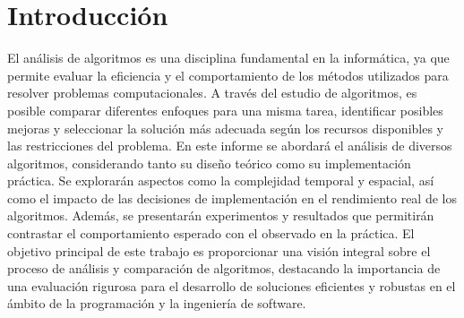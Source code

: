 \section{Introducción}
El análisis de algoritmos es una disciplina fundamental en la informática, ya que permite evaluar la eficiencia y el comportamiento de los métodos utilizados para resolver problemas computacionales.
A través del estudio de algoritmos, es posible comparar diferentes enfoques para una misma tarea, identificar posibles mejoras y seleccionar la solución más adecuada según los recursos disponibles y las restricciones del problema.
En este informe se abordará el análisis de diversos algoritmos, considerando tanto su diseño teórico como su implementación práctica. Se explorarán aspectos como la complejidad temporal y espacial, así como el impacto de las decisiones de implementación en el rendimiento real de los algoritmos.
Además, se presentarán experimentos y resultados que permitirán contrastar el comportamiento esperado con el observado en la práctica.
El objetivo principal de este trabajo es proporcionar una visión integral sobre el proceso de análisis y comparación de algoritmos, destacando la importancia de una evaluación rigurosa para el desarrollo de soluciones eficientes y robustas en el ámbito de la programación y la ingeniería de software.